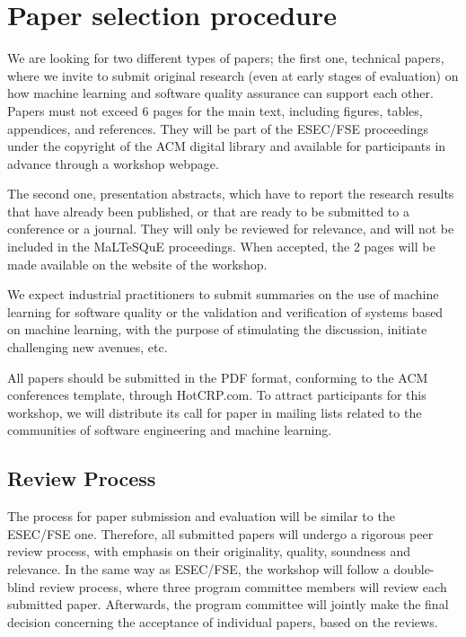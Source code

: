 \section{Paper selection procedure}
\label{sec:submissions}

We are looking for two different types of papers; the first one, \ie technical papers, where we invite to submit original research (even at early stages of evaluation) on how machine learning and software quality assurance can support each other.
Papers must not exceed 6 pages for the main text, including figures, tables, appendices, and references.
They will be part of the ESEC/FSE proceedings under the copyright of the ACM digital library and available for participants in advance through a workshop webpage.

The second one, \ie presentation abstracts, which have to report the research results that have already been published, or that are ready to be submitted to a conference or a journal.
They will only be reviewed for relevance, and will not be included in the MaLTeSQuE proceedings.
When accepted, the 2 pages will be made available on the website of the workshop.

We expect industrial practitioners to submit summaries on the use of machine learning for software quality or the validation and verification of systems based on machine learning, with the purpose of stimulating the discussion, initiate challenging new avenues, etc.

All papers should be submitted in the PDF format, conforming to the ACM conferences template, through HotCRP.com.
To attract participants for this workshop, we will distribute its call for paper in mailing lists related to the communities of software engineering and machine learning.

\subsection{Review Process}
The process for paper submission and evaluation will be similar to the ESEC/FSE one.
Therefore, all submitted papers will undergo a rigorous peer review process, with emphasis on their originality, quality, soundness and relevance.
In the same way as ESEC/FSE, the workshop will follow a double-blind review process, where three program committee members will review each submitted paper.
Afterwards, the program committee will jointly make the final decision concerning the acceptance of individual papers, based on the reviews.

